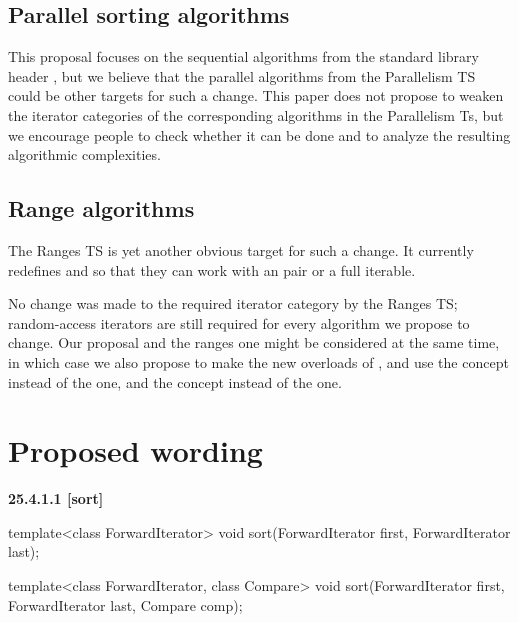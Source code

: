 \documentclass{isocpp_proposal}
\begin{document}
\subsection{Parallel sorting algorithms}

This proposal focuses on the sequential algorithms from the standard library header , but we believe that the parallel algorithms from the Parallelism TS \cite{N4507} could be other targets for such a change. This paper does not propose to weaken the iterator categories of the corresponding algorithms in the Parallelism Ts, but we encourage people to check whether it can be done and to analyze the resulting algorithmic complexities.

\subsection{Range algorithms}

The Ranges TS \cite{N4560} is yet another obvious target for such a change. It currently redefines  and  so that they can work with an \tcode{[iterator, sentinel)} pair or a full iterable.

\vspace{0.3cm}

No change was made to the required iterator category by the Ranges TS; random-access iterators are still required for every algorithm we propose to change. Our proposal and the ranges one might be considered at the same time, in which case we also propose to make the new overloads of ,  and  use the  concept instead of the  one, and the  concept instead of the  one.

\section{Proposed wording}

\textbf{25.4.1.1  [sort]}

\begin{itemdecl}
template<class ForwardIterator>
  void sort(ForwardIterator first, ForwardIterator last);

template<class ForwardIterator, class Compare>
  void sort(ForwardIterator first, ForwardIterator last,
            Compare comp);
\end{itemdecl}
\end{document}
